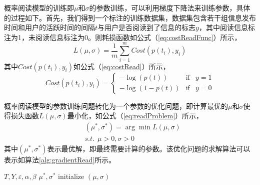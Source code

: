 概率阅读模型的训练即$\mu$和$\sigma$的参数训练，可以利用梯度下降法来训练参数，具体的过程如下。首先，我们得到一个标注的训练数据集，数据集包含若干组信息发布时间和用户的活跃时间的间隔$t$与用户是否阅读到了信息的标志$y$，其中阅读信息标注为1，未阅读信息标注为0。则耗损函数如公式（\ref{eq:costReadFunc}）所示，
\begin{equation}
\label{eq:costReadFunc}
	L\left(\mu, \sigma \right) = \frac{1}{m}\sum_{i=1}^m {Cost\left( p\left(t_i\right), y_i\right)}
\end{equation}
其中$Cost\left( p\left(t_i\right), y_i\right)$如公式（\ref{eq:costRead}）所示，
\begin{equation}
\label{eq:costRead}
	Cost\left( p\left(t_i\right), y_i\right) = \left\{ \begin{array}{rcl} -\log \left(p\left(t\right)\right) & \mbox{if} & y=1 \\ -\log \left(1 - p\left(t\right) \right) & \mbox{if} & y=0  \end{array} \right.
\end{equation}

概率阅读模型的参数训练问题转化为一个参数的优化问题，即计算最优的$\mu$和$\sigma$使得损失函数$L\left(\mu, \sigma \right)$最小化，如公式（\ref{eq:readProblem}）所示，
\begin{equation}
\label{eq:readProblem}
    \begin{split}
        &\left(\mu^{\ast},\sigma^{\ast}\right) = \arg\min{L\left(\mu, \sigma \right)}\\
        &s.t.~~\mu > 0, \sigma > 0
    \end{split}
\end{equation}
其中$\left(\mu^{\ast},\sigma^{\ast}\right)$表示最优解，即最终需要计算的参数。该优化问题的求解算法可以表示如算法\ref{alg:gradientRead}所示。
\begin{algorithm}[!ht]
	\caption{$Gradient(T,Y)$}
	\label{alg:gradientRead}
	\begin{algorithmic}[1]
	\REQUIRE $T,Y,\varepsilon,\alpha,\beta$
	\ENSURE $\mu^{\ast},\sigma^{\ast}$
	\STATE initialize $\left(\mu,\sigma\right)$
	\ENDWHILE
    \end{algorithmic}
\end{algorithm}


